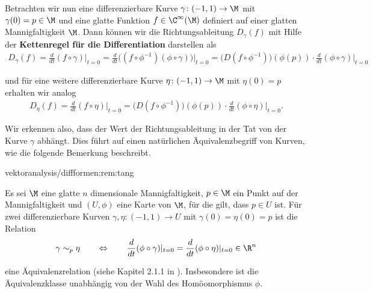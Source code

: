 \documentclass[letterpaper,10pt,english]{jupyterBook}
\begin{document}
\par
Betrachten wir nun eine differenzierbare Kurve \(\gamma \colon (-1, 1) \rightarrow \M\) mit \(\gamma(0)=p \in \M\) und eine glatte Funktion \(f \in \C^\infty(\M)\) definiert auf einer glatten Mannigfaltigkeit \(\M\).
Dann können wir die Richtungsableitung \(D_\gamma(f)\) mit Hilfe der \textbf{Kettenregel für die Differentiation} darstellen als
\begin{align*}
D_\gamma(f) = \frac{d}{dt}(f\circ \gamma)\big\rvert_{t=0} = \frac{d}{dt}\big( (f\circ \phi^{-1}) (\phi \circ \gamma) \big)\rvert_{t=0} = 
\big(D(f\circ \phi^{-1})\big)(\phi(p))\cdot \frac{d}{dt}(\phi \circ \gamma)\rvert_{t=0}
\end{align*}
\par
und für eine weitere differenzierbare Kurve \(\eta \colon (-1, 1) \rightarrow \M\) mit \(\eta(0)=p\) erhalten wir analog
\begin{align*}
D_\eta(f) = \frac{d}{dt}(f\circ \eta)\big\rvert_{t=0} = 
\big(D(f\circ \phi^{-1})\big)(\phi(p))\cdot \frac{d}{dt}(\phi \circ \eta)\rvert_{t=0}.
\end{align*}
\par
Wir erkennen also, dass der Wert der Richtungsableitung in der Tat von der Kurve \(\gamma\) abhängt.
Dies führt auf einen natürlichen Äquivalenzbegriff von Kurven, wie die folgende Bemerkung beschreibt.
\begin{remark}{}{vektoranalysis/diffformen:rem:tang}



\par
Es sei \(\M\) eine glatte \(n\) dimensionale Mannigfaltigkeit, \(p\in\M\) ein Punkt auf der Mannigfaltigkeit und \((U,\phi)\) eine Karte von \(\M\), für die gilt, dass \(p\in U\) ist.
Für zwei differenzierbare Kurven \(\gamma, \eta:(-1,1) \to U\) mit \(\gamma(0) = \eta(0) = p\) ist die Relation
\begin{align*}
\gamma \sim_p \eta
\qquad \Leftrightarrow \qquad
\frac{d}{dt}(\phi \circ \gamma)\rvert_{t=0} = \frac{d}{dt}(\phi \circ \eta)\rvert_{t=0}\in \R^n
\end{align*}
\par
eine Äquivalenzrelation (siehe Kapitel 2.1.1 in \cite{Bur20}).
Insbesondere ist die Äquivalenzklasse unabhängig von der Wahl des Homöomorphismus \(\phi\).
\end{remark}
\end{document}

